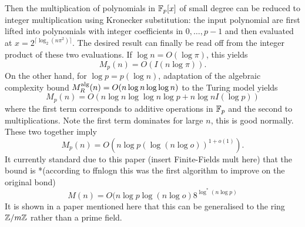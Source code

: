 Then the multiplication of polynomials in $\mathbb{F}_p[x]$ of small degree can be reduced to integer multiplication using Kronecker substitution: the input polynomial are first lifted into polynomials with integer coefficients in $0, \ldots, p - 1$ and then evaluated at $x = 2^{\lceil \log_2(n \pi^2) \rceil}$. The desired result can finally be read off from the integer product of these two evaluations. If $\log n = O(\log \pi)$, this yields
\[
    M_p(n) = O(I(n \log \pi)).
\]
On the other hand, for $\log p = p(\log n)$, adaptation of the algebraic complexity bound $M_R^\textrm{alg}(n) = O(n \log n \log \log n)$ to the Turing model yields
\[
    M_p(n) = O(n \log n \log \log n \log p + n \log n I(\log p))
\]
where the first term corresponds to additive operations in $\mathbb{F}_p$ and the second to multiplications. Note the first term dominates for large $n$, this is good normally. These two together imply 
\[
    M_p(n) = O(n \log p (\log (n \log o))^{1 + o(1)}).
\]
It currently standard due to this paper (insert Finite-Fields mult here) that the bound is *(according to ffnlogn  this was the first algorithm to improve on the original bond)
\[
    M(n) = O(n \log p \log (n \log o) 8^{\log^\ast(n \log p)}
\]
It is shown in a paper mentioned here that this can be generalised to the ring ${\mathbb Z} / m{\mathbb Z}$ rather than a prime field.
